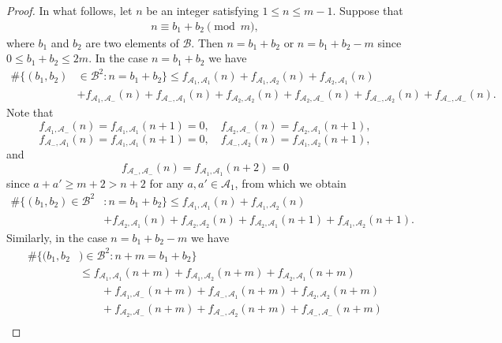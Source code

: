 \documentclass[10pt,a4paper]{amsart}
\begin{document}
\begin{proof}
In what follows, let $n$ be an integer satisfying $1\le n\le m-1$. Suppose that
\begin{align*}
    n\equiv b_1+b_2\pmod{m},
\end{align*}
where $b_1$ and $b_2$ are two elements of $\mathcal{B}$.
Then $n=b_1+b_2$ or $n=b_1+b_2-m$ since $0\le b_1+b_2\le 2m$. In the case $n=b_1+b_2$ we have
\begin{align*}
    \#\big\{(b_1, b_2)&\in \mathcal{B}^2 :  n=b_1 +b_2\big\}
    \le f_{\mathcal{A}_{1},\mathcal{A}_{1}}(n)+f_{\mathcal{A}_{1},\mathcal{A}_{2}}(n)+f_{\mathcal{A}_{2},\mathcal{A}_{1}}(n)\\
&+f_{\mathcal{A}_{1},\mathcal{A}_{-}}(n)+f_{\mathcal{A}_{-},\mathcal{A}_{1}}(n)+f_{\mathcal{A}_{2},\mathcal{A}_{2}}(n)+f_{\mathcal{A}_{2},\mathcal{A}_{-}}(n)+f_{\mathcal{A}_{-},\mathcal{A}_{2}}(n)+f_{\mathcal{A}_{-},\mathcal{A}_{-}}(n).
\end{align*}
Note that
$$
f_{\mathcal{A}_{1},\mathcal{A}_{-}}(n)=f_{\mathcal{A}_{1},\mathcal{A}_{1}}(n+1)=0,\quad f_{\mathcal{A}_{2},\mathcal{A}_{-}}(n)=f_{\mathcal{A}_{2},\mathcal{A}_{1}}(n+1),
$$
$$
f_{\mathcal{A}_{-},\mathcal{A}_{1}}(n)=f_{\mathcal{A}_{1},\mathcal{A}_{1}}(n+1)=0,\quad f_{\mathcal{A}_{-},\mathcal{A}_{2}}(n)=f_{\mathcal{A}_{1},\mathcal{A}_{2}}(n+1),
$$
and
$$
f_{\mathcal{A}_{-},\mathcal{A}_{-}}(n)=f_{\mathcal{A}_{1},\mathcal{A}_{1}}(n+2)=0
$$
since $a+a'\ge m+2>n+2$ for any $a, a'\in \mathcal{A}_{1}$,
from which we obtain
\begin{align}\label{eq-proof-4}
    \#\big\{(b_1, b_2)\in \mathcal{B}^2& :  n=b_1 +b_2\big\}
    \le f_{\mathcal{A}_{1},\mathcal{A}_{1}}(n)+f_{\mathcal{A}_{1},\mathcal{A}_{2}}(n)\nonumber\\
    &+f_{\mathcal{A}_{2},\mathcal{A}_{1}}(n)+f_{\mathcal{A}_{2},\mathcal{A}_{2}}(n)+f_{\mathcal{A}_{2},\mathcal{A}_{1}}
    (n+1)+f_{\mathcal{A}_{1},\mathcal{A}_{2}}
    (n+1).
\end{align}
Similarly, in the case $n=b_1+b_2-m$ we have
\begin{align}\label{eq-proof-5}
    \#\big\{(b_1,b_2&)\in \mathcal{B}^2: n +m= b_1+b_2\big\}\nonumber\\
    &\le f_{\mathcal{A}_{1},\mathcal{A}_{1}}(n+m)+f_{\mathcal{A}_{1},\mathcal{A}_{2}}(n+m)
    +f_{\mathcal{A}_{2},\mathcal{A}_{1}}(n+m)\nonumber\\
    &\quad \quad +f_{\mathcal{A}_{1},\mathcal{A}_{-}}(n+m)+f_{\mathcal{A}_{-},\mathcal{A}_{1}}(n+m)+f_{\mathcal{A}_{2},\mathcal{A}_{2}}(n+m)\nonumber\\
    &\quad \quad +f_{\mathcal{A}_{2},\mathcal{A}_{-}}(n+m)+f_{\mathcal{A}_{-},\mathcal{A}_{2}}(n+m)+f_{\mathcal{A}_{-},\mathcal{A}_{-}}(n+m)\nonumber\\

\end{align}
\end{proof}
\end{document}
